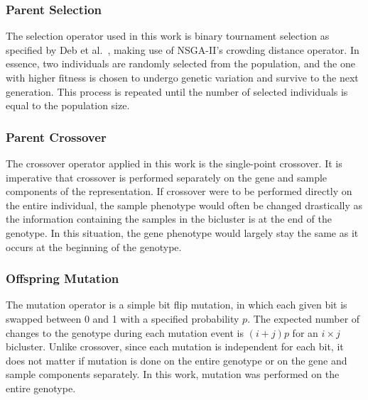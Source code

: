 \subsubsection*{Parent Selection}
The selection operator used in this work is binary tournament selection as specified by Deb et al.~\cite{deb2002fast}, making use of NSGA-II's crowding distance operator.
In essence, two individuals are randomly selected from the population, and the one with higher fitness is chosen to undergo genetic variation and survive to the next generation.
This process is repeated until the number of selected individuals is equal to the population size.

\subsubsection*{Parent Crossover}
The crossover operator applied in this work is the single-point crossover. It is imperative that crossover is performed separately on the gene and sample components of the representation.
If crossover were to be performed directly on the entire individual, the sample phenotype would often be changed drastically as the information containing the samples in the bicluster is at the end of the genotype.
In this situation, the gene phenotype would largely stay the same as it occurs at the beginning of the genotype.

\subsubsection*{Offspring Mutation}
The mutation operator is a simple bit flip mutation, in which each given bit is swapped between 0 and 1 with a specified probability $p$.
The expected number of changes to the genotype during each mutation event is $(i+j)p$ for an $i \times j$ bicluster.
Unlike crossover, since each mutation is independent for each bit, it does not matter if mutation is done on the entire genotype or on the gene and sample components separately.
In this work, mutation was performed on the entire genotype.

